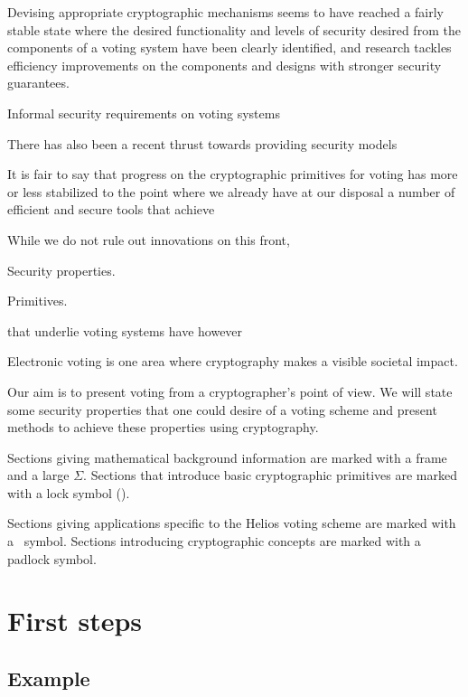 \documentclass[envcountsame]{llncs}
\begin{document}
Devising appropriate cryptographic mechanisms seems to have reached a fairly stable state where the desired functionality and levels of security desired from the components of a voting system have been clearly identified, and research tackles efficiency improvements on the components and designs with stronger security guarantees.  

Informal security requirements on voting systems 

There has also been a recent thrust towards providing security models 

It is fair to say that progress on the cryptographic  primitives for voting has more or less stabilized to the point where we already have at our disposal a number of efficient and secure tools that achieve 


While we do not rule out innovations on this front, 

Security properties. 


Primitives. 



that underlie voting systems have however 



Electronic voting is one area where cryptography makes a visible societal impact. 


Our aim is to present voting from a cryptographer's point of view. We will state
some security properties that one could desire of a voting scheme and present
methods to achieve these properties using cryptography.

Sections giving mathematical background information are marked with a frame and
a large $\Sigma$. 
Sections that introduce basic cryptographic primitives are marked with a lock symbol ().

Sections giving applications specific to the Helios voting
scheme are marked with a \Sun\ symbol. Sections introducing cryptographic
concepts are marked with a padlock symbol.

\section{First steps}

\subsection{Example}
\end{document}
